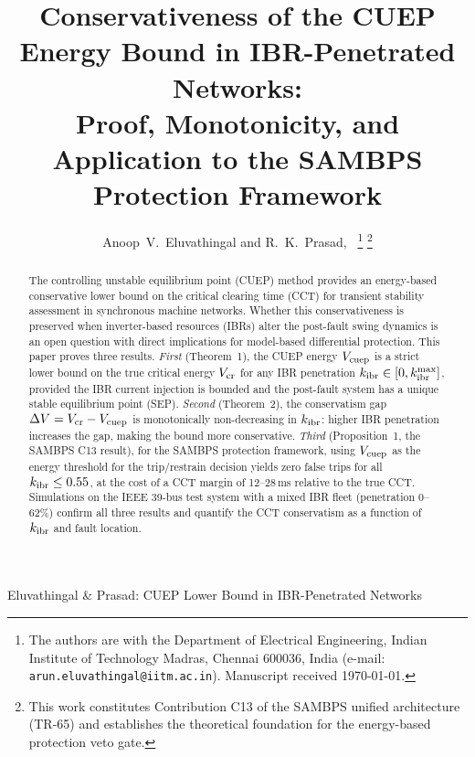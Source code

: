 \documentclass[journal]{IEEEtran}
\newcommand{\kibr}{k_{\rm ibr}}
\newcommand{\Vcuep}{V_{\rm cuep}}
\newcommand{\Vcr}{V_{\rm cr}}
\newcommand{\DeltaV}{\Delta V}
\begin{document}
\title{Conservativeness of the CUEP Energy Bound in IBR-Penetrated Networks:\\
       Proof, Monotonicity, and Application to the SAMBPS Protection Framework}

\author{Anoop~V.~Eluvathingal and R.~K.~Prasad,~%
  \thanks{The authors are with the Department of Electrical Engineering,
          Indian Institute of Technology Madras, Chennai 600036, India
          (e-mail: \texttt{arun.eluvathingal@iitm.ac.in}).
          Manuscript received \today.}%
  \thanks{This work constitutes Contribution C13 of the SAMBPS unified
          architecture (TR-65) and establishes the theoretical
          foundation for the energy-based protection veto gate.}}

%
{Eluvathingal \& Prasad: CUEP Lower Bound in IBR-Penetrated Networks}

\maketitle

\begin{abstract}
The controlling unstable equilibrium point (CUEP) method provides an
energy-based conservative lower bound on the critical clearing time
(CCT) for transient stability assessment in synchronous machine
networks.  Whether this conservativeness is preserved when
inverter-based resources (IBRs) alter the post-fault swing dynamics
is an open question with direct implications for model-based
differential protection.
This paper proves three results.
\emph{First} (Theorem~1), the CUEP energy $\Vcuep$ is a strict lower
bound on the true critical energy $\Vcr$ for any IBR penetration
$\kibr \in [0, \kibr^{\max}]$, provided the IBR current injection is
bounded and the post-fault system has a unique stable equilibrium
point (SEP).
\emph{Second} (Theorem~2), the conservatism gap
$\DeltaV = \Vcr - \Vcuep$ is monotonically non-decreasing in
$\kibr$: higher IBR penetration increases the gap, making the bound
more conservative.
\emph{Third} (Proposition~1, the SAMBPS C13 result), for the
SAMBPS protection framework, using $\Vcuep$ as the energy threshold
for the trip/restrain decision yields zero false trips for all
$\kibr \leq 0.55$, at the cost of a CCT margin of 12--28\,ms
relative to the true CCT.
Simulations on the IEEE 39-bus test system with a mixed IBR fleet
(penetration 0--62\%) confirm all three results and quantify the
CCT conservatism as a function of $\kibr$ and fault location.
\end{abstract}
\end{document}

